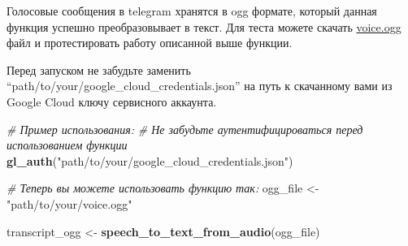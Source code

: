 \documentclass[
]{book}
\newenvironment{Shaded}{\begin{snugshade}}{\end{snugshade}}
\newcommand{\AttributeTok}[1]{\textcolor[rgb]{0.13,0.29,0.53}{#1}}
\newcommand{\CommentTok}[1]{\textcolor[rgb]{0.56,0.35,0.01}{\textit{#1}}}
\newcommand{\ControlFlowTok}[1]{\textcolor[rgb]{0.13,0.29,0.53}{\textbf{#1}}}
\newcommand{\DecValTok}[1]{\textcolor[rgb]{0.00,0.00,0.81}{#1}}
\newcommand{\FunctionTok}[1]{\textcolor[rgb]{0.13,0.29,0.53}{\textbf{#1}}}
\newcommand{\NormalTok}[1]{#1}
\newcommand{\OtherTok}[1]{\textcolor[rgb]{0.56,0.35,0.01}{#1}}
\newcommand{\SpecialCharTok}[1]{\textcolor[rgb]{0.81,0.36,0.00}{\textbf{#1}}}
\newcommand{\StringTok}[1]{\textcolor[rgb]{0.31,0.60,0.02}{#1}}
\begin{document}
\begin{Shaded}
\end{Shaded}

Голосовые сообщения в telegram хранятся в ogg формате, который данная функция успешно преобразовывает в текст. Для теста можете скачать \href{/files/voice.ogg}{voice.ogg} файл и протестировать работу описанной выше функции.

Перед запуском не забудьте заменить ``path/to/your/google\_cloud\_credentials.json'' на путь к скачанному вами из Google Cloud ключу сервисного аккаунта.

\begin{Shaded}
\begin{Highlighting}[]
\CommentTok{\# Пример использования:}
\CommentTok{\# Не забудьте аутентифицироваться перед использованием функции}
\FunctionTok{gl\_auth}\NormalTok{(}\StringTok{"path/to/your/google\_cloud\_credentials.json"}\NormalTok{)}

\CommentTok{\# Теперь вы можете использовать функцию так:}
\NormalTok{ogg\_file }\OtherTok{\textless{}{-}} \StringTok{"path/to/your/voice.ogg"}

\NormalTok{transcript\_ogg }\OtherTok{\textless{}{-}} \FunctionTok{speech\_to\_text\_from\_audio}\NormalTok{(ogg\_file)}
\end{Highlighting}
\end{Shaded}
\end{document}
